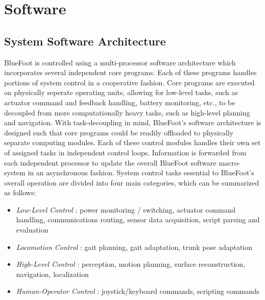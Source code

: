 \label{ch::software}
\chapter{Software}
	
	\section{System Software Architecture}
	
	BlueFoot is controlled using a multi-processor software architecture which incorporates several independent core programs. Each of these programs handles portions of system control in a cooperative fashion. Core programs are executed on physically seperate operating units, allowing for low-level tasks, such as actuator command and feedback handling, battery monitoring, etc., to be decoupled from more computationally heavy tasks, such as high-level planning and navigation. With task-decoupling in mind, BlueFoot's software architecture is designed such that core programs could be readily offloaded to physically separate computing modules. Each of these control modules handles their own set of assigned tasks in independent control loops. Information is forwarded from each independent processor to update the overall BlueFoot software macro-system in an asynchronous fashion. System control tasks essential to BlueFoot's overall operation are divided into four main categories, which can be summarized as follows:
		\begin{itemize}
			\item{
			\emph{Low-Level Control} : 
				power monitoring / switching, 
				actuator command handling, 
				communications routing,
				sensor data acquisition,
				script parsing and evaluation
			}
			\item{
			\emph{Locomotion Control} : 
				gait planning, 
				gait adaptation, 
				trunk pose adaptation
			}
			\item{
			\emph{High-Level Control} : 
				perception, 
				motion planning, 
				surface reconstruction, 
				navigation, 
				localization
			}
			\item{
			\emph{Human-Operator Control} : 
				joystick/keyboard commands,
				scripting commands
			}
		\end{itemize}
